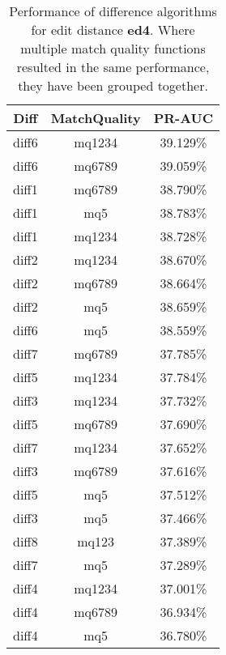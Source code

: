 \begin{table}[tbph]
\begin{center}
\begin{tabular}{|c|c||c|}
\hline
Diff & MatchQuality & PR-AUC  \\
\hline
\hline
diff6 & mq1234 & 39.129\% \\
diff6 & mq6789 & 39.059\% \\
diff1 & mq6789 & 38.790\% \\
diff1 & mq5 & 38.783\% \\
diff1 & mq1234 & 38.728\% \\
diff2 & mq1234 & 38.670\% \\
diff2 & mq6789 & 38.664\% \\
diff2 & mq5 & 38.659\% \\
diff6 & mq5 & 38.559\% \\
diff7 & mq6789 & 37.785\% \\
diff5 & mq1234 & 37.784\% \\
diff3 & mq1234 & 37.732\% \\
diff5 & mq6789 & 37.690\% \\
diff7 & mq1234 & 37.652\% \\
diff3 & mq6789 & 37.616\% \\
diff5 & mq5 & 37.512\% \\
diff3 & mq5 & 37.466\% \\
diff8 & mq123 & 37.389\% \\
diff7 & mq5 & 37.289\% \\
diff4 & mq1234 & 37.001\% \\
diff4 & mq6789 & 36.934\% \\
diff4 & mq5 & 36.780\% \\
\hline
\end{tabular}
\end{center}
\caption{Performance of difference algorithms for
  edit distance \textbf{ed4}.  Where multiple match
  quality functions resulted in the same performance, they
  have been grouped together.}
\label{tab:editlongbyed4}
\end{table}
